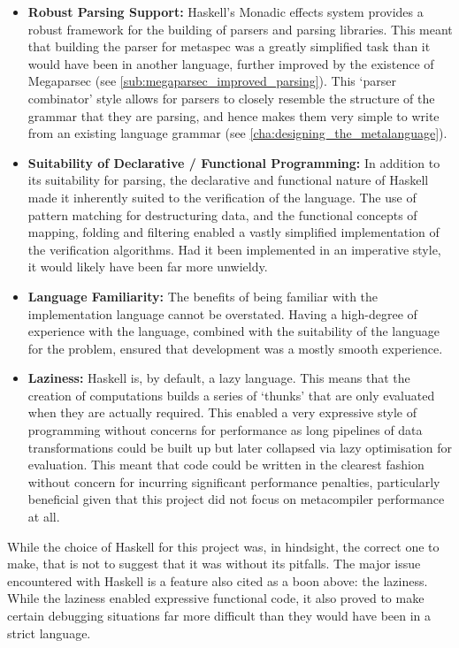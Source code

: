 \begin{itemize}
    \item \textbf{Robust Parsing Support:} Haskell's Monadic effects system provides a robust framework for the building of parsers and parsing libraries. 
    This meant that building the parser for \gls{metaspec} was a greatly simplified task than it would have been in another language, further improved by the existence of Megaparsec (see \autoref{sub:megaparsec_improved_parsing}). 
    This `parser combinator' style allows for parsers to closely resemble the structure of the grammar that they are parsing, and hence makes them very simple to write from an existing language grammar (see \autoref{cha:designing_the_metalanguage}).
    \item \textbf{Suitability of Declarative / Functional Programming:} In addition to its suitability for parsing, the declarative and functional nature of Haskell made it inherently suited to the verification of the language.
    The use of pattern matching for destructuring data, and the functional concepts of mapping, folding and filtering enabled a vastly simplified implementation of the verification algorithms.
    Had it been implemented in an imperative style, it would likely have been far more unwieldy. 
    \item \textbf{Language Familiarity:} The benefits of being familiar with the implementation language cannot be overstated. 
    Having a high-degree of experience with the language, combined with the suitability of the language for the problem, ensured that development was a mostly smooth experience. 
    \item \textbf{Laziness:} Haskell is, by default, a lazy language.
    This means that the creation of computations builds a series of `thunks' that are only evaluated when they are actually required.
    This enabled a very expressive style of programming without concerns for performance as long pipelines of data transformations could be built up but later collapsed via lazy optimisation for evaluation.
    This meant that code could be written in the clearest fashion without concern for incurring significant performance penalties, particularly beneficial given that this project did not focus on metacompiler performance at all.
\end{itemize}

While the choice of Haskell for this project was, in hindsight, the correct one to make, that is not to suggest that it was without its pitfalls.
The major issue encountered with Haskell is a feature also cited as a boon above: the laziness. 
While the laziness enabled expressive functional code, it also proved to make certain debugging situations far more difficult than they would have been in a strict language.\\

